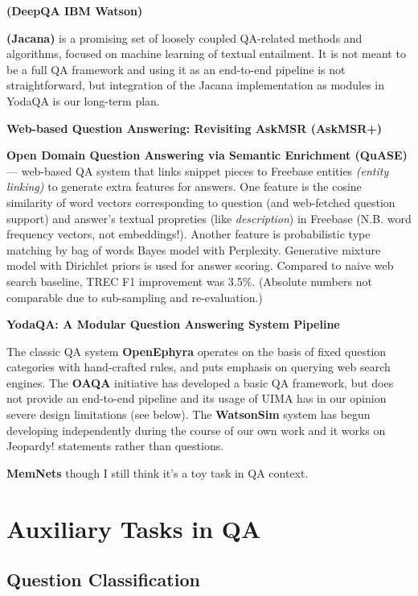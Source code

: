 \textbf{(DeepQA IBM Watson)} \citep{WatsonOverview}

\textbf{(Jacana)} \citep{TreeEdit2013Yao} \citep{TreeEditIR2013Yao}
is a promising set of loosely coupled QA-related methods
and algorithms, focused on machine learning of textual entailment.  It is
not meant to be a full QA framework and using it as an end-to-end pipeline
is not straightforward, but integration of the Jacana implementation as
modules in YodaQA is our long-term plan.

\textbf{Web-based Question Answering: Revisiting AskMSR (AskMSR+)}

\textbf{Open Domain Question Answering via Semantic Enrichment (QuASE)} \citep{QuASE}
	--- web-based QA system that links snippet pieces to Freebase entities
	\textit{(entity linking)} to generate extra features for answers.
	One feature is the cosine similarity of word
	vectors corresponding to question (and web-fetched question support)
	and answer's textual propreties (like \textit{description}) in Freebase
	(N.B. word frequency vectors, not embeddings!).
	Another feature is probabilistic type matching by bag of words Bayes model
	with Perplexity.  Generative mixture model with Dirichlet priors is used
	for answer scoring.  Compared to naive web search baseline, TREC F1
	improvement was 3.5\%.  (Absolute numbers not comparable due to
	sub-sampling and re-evaluation.)

\textbf{YodaQA: A Modular Question Answering System Pipeline} \citep{YodaQAPoster2015}

The classic QA system \textbf{OpenEphyra} \citep{Ephyra2006}
operates on the basis of fixed question categories with hand-crafted rules,
and puts emphasis on querying web search engines.
The \textbf{OAQA} initiative \citep{OAQATowards} has developed a basic QA framework,
but does not provide an end-to-end pipeline and its usage of UIMA has
in our opinion severe design limitations (see below).
The \textbf{WatsonSim} system \citep{WatsonSim} has begun developing independently
during the course of our own work and it works on Jeopardy! statements rather
than questions.

\textbf{MemNets} though I still think it's a toy task in QA context.

\section{Auxiliary Tasks in QA}

\subsection{Question Classification}


